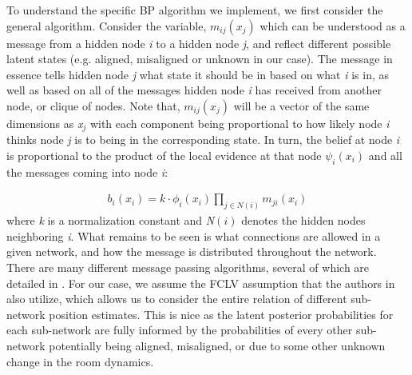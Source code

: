 \documentclass{article}
\begin{document}
To understand the specific BP algorithm we implement, we first consider the general algorithm. Consider the variable, $\textit{m$_{ij}$}\left(\textit{x$_j$}\right)$ which can be understood as a message from a hidden node \textit{i} to a hidden node \textit{j}, and reflect different possible latent states (e.g. aligned, misaligned or unknown in our case). The message in essence tells hidden node \textit{j} what state it should be in based on what \textit{i} is in, as well as based on all of the messages hidden node \textit{i} has received from another node, or clique of nodes. Note that, $\textit{m$_{ij}$}\left(\textit{x$_j$}\right)$ will be a vector of the same dimensions as \textit{x$_j$} with each component being proportional to how likely node \textit{i} thinks node \textit{j} is to being in the corresponding state. In turn, the belief at node \textit{i} is proportional to the product of the local evidence at that node $\textit{$\psi_i$}\left(\textit{x$_i$}\right)$ and all the messages coming into node \textit{i}:

\begin{equation}\label{belief_msg_equation}
    \begin{aligned}
        \textit{b$_i$}\left(\textit{x$_i$}\right) = \textit{k} \cdot \textit{$\phi_i$}\left(\textit{x$_i$}\right)\prod_{\textit{j} \in \textit{N}\left(\textit{i}\right)} \textit{m$_{ji}$}\left(\textit{x$_i$}\right)
    \end{aligned}
\end{equation} where \textit{k} is a normalization constant and \textit{N}$\left(\textit{i}\right)$ denotes the hidden nodes neighboring \textit{i}. What remains to be seen is what connections are allowed in a given network, and how the message is distributed throughout the network. There are many different message passing algorithms, several of which are detailed in \cite{JSY_understandBeliefPropAndGeneral}. For our case, we assume the FCLV assumption that the authors in \cite{NA_misalignmentRecMRFsFcn} also utilize, which allows us to consider the entire relation of different sub-network position estimates. This is nice as the latent posterior probabilities for each sub-network are fully informed by the probabilities of every other sub-network potentially being aligned, misaligned, or due to some other unknown change in the room dynamics.
\end{document}
